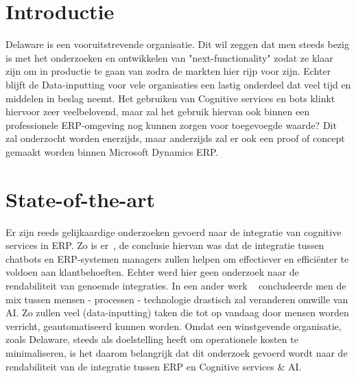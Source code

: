 
\section{Introductie} %
\label{sec:introductie}
Delaware is een vooruitstrevende organisatie. Dit wil zeggen dat men steeds bezig is met het onderzoeken en ontwikkelen van "next-functionality"  zodat ze klaar zijn om in productie te gaan van zodra de markten hier rijp voor zijn. Echter blijft de Data-inputting voor vele organisaties een lastig onderdeel dat veel tijd en middelen in beslag neemt. Het gebruiken van Cognitive services en bots klinkt hiervoor zeer veelbelovend, maar zal het gebruik hiervan ook binnen een professionele ERP-omgeving nog kunnen zorgen voor toegevoegde waarde? Dit zal onderzocht worden enerzijds, maar anderzijds zal er ook een proof of concept gemaakt worden binnen Microsoft Dynamics ERP. 



\section{State-of-the-art}
\label{sec:state-of-the-art}
Er zijn reeds gelijkaardige onderzoeken gevoerd naar de integratie van cognitive services in ERP. Zo is er~\autocite{Meidina&Awad&Anesi2017}, de conclusie hiervan was dat de integratie tussen chatbots en ERP-systemen managers zullen helpen om effectiever en efficiënter te voldoen aan klantbehoeften. Echter werd hier geen onderzoek naar de rendabiliteit van genoemde integraties. In een ander werk ~\autocite{De Baat2016} concludeerde men de mix tussen mensen - processen - technologie drastisch zal veranderen omwille van AI. Zo zullen veel (data-inputting) taken die tot op vandaag door mensen worden verricht, geautomatiseerd kunnen worden. Omdat een winstgevende organisatie, zoals Delaware, steeds als doelstelling heeft om operationele kosten te minimaliseren, is het daarom belangrijk dat dit onderzoek gevoerd wordt naar de rendabiliteit van de integratie tussen ERP en Cognitive services \& AI. 
